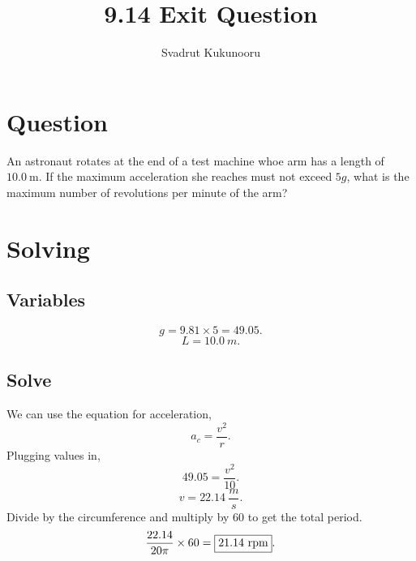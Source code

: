 \documentclass[a4paper]{report}
\title{9.14 Exit Question}
\author{Svadrut Kukunooru}
\begin{document}
    \maketitle
\section{Question}%
\label{sec:Question}
An astronaut rotates at the end of a test machine whoe arm has a length of $10.0\ \text{m}$. If the maximum acceleration she reaches must not exceed $5g$, what is the maximum number of revolutions per minute of the arm? 
\section{Solving}%
\label{sec:Solving}
\subsection{Variables}%
\label{sub:Variables}
\[
    g = 9.81 \times 5 = 49.05
.\] 
\[
    L = 10.0\ m
.\] 
\subsection{Solve}%
\label{sub:Solve}
We can use the equation for acceleration, 
\[
    a_c = \frac{v^2}{r}
.\] 
Plugging values in, 
\[
49.05 = \frac{v^2}{10}
.\] 
\[
v = 22.14\ \frac{m}{s}
.\] 
Divide by the circumference and multiply by 60 to get the total period. 
\[
    \frac{22.14}{20\pi} \times 60 = \fbox{21.14\ \text{rpm}}
.\] 
\end{document}
